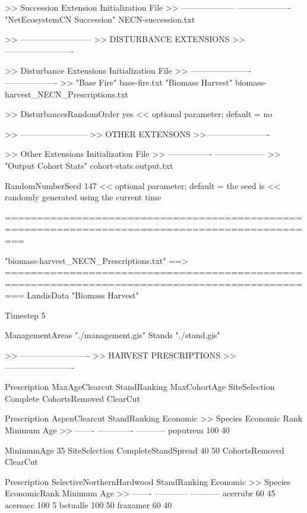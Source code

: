 >> 	Succession Extension     	Initialization File
>> 	--------------------     	-------------------
   	"NetEcosystemCN Succession"	NECN-succession.txt


>> --------------------------
>> DISTURBANCE EXTENSIONS
>> -------------------------

>> 	Disturbance Extensions   	Initialization File
>>	 ----------------------   	-------------------
>>	"Base Fire"			base-fire.txt
	"Biomass Harvest"		biomass-harvest_NECN_Prescriptions.txt


>>   DisturbancesRandomOrder  yes  << optional parameter; default = no

>> ------------------------
>> OTHER EXTENSONS
>> ----------------------

>> 	Other Extensions         	Initialization File
>>	 ----------------         	------------------
>>  	 "Output Cohort Stats"    	cohort-stats.output.txt


RandomNumberSeed  147  << optional parameter; default = the seed is
                         << randomly generated using the current time

===============================================================================================




"biomass-harvest_NECN_Prescriptions.txt" ==>
===============================================================================================
LandisData  "Biomass Harvest"

Timestep    5

ManagementAreas 	"./management.gis"
Stands     		 "./stand.gis"



>> -------------------------
>> HARVEST PRESCRIPTIONS
>> -------------------------

Prescription MaxAgeClearcut
    StandRanking 	MaxCohortAge
    SiteSelection 	Complete
    CohortsRemoved 	ClearCut


Prescription    AspenClearcut
    StandRanking    Economic
>> 	Species 	Economic Rank 	Minimum Age
>> 	------- 	------------- 	-----------
    	poputrem  	 100           40    
    
    MinimumAge  	35
    SiteSelection	CompleteStandSpread 40 50
    CohortsRemoved	ClearCut

    
Prescription SelectiveNorthernHardwood
    StandRanking    Economic
>>	Species 	EconomicRank	 Minimum Age
>>	------- 	------------ 	-----------
    	acerrubr   	60 	     	45
    	acersacc   	100          	5
    	betualle   	100	     	50
    	fraxamer   	60	     	40

